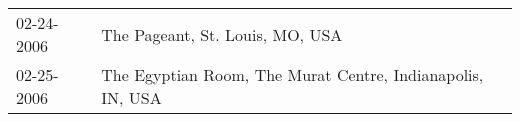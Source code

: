 \begin{supertabular}{ll}
 02-24-2006 &                             The Pageant, St. Louis, MO, USA \\
 02-25-2006 &  The Egyptian Room, The Murat Centre, Indianapolis, IN, USA \\
\end{supertabular}
